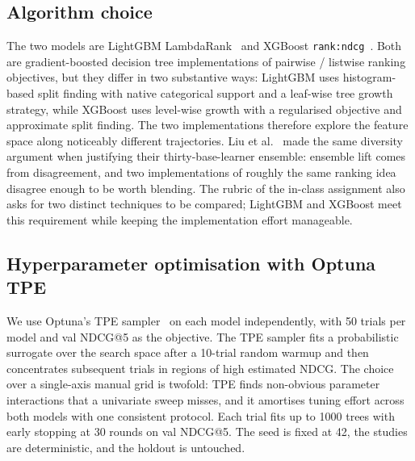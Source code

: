 
\subsection{Algorithm choice}

The two models are LightGBM LambdaRank~\cite{ke2017lightgbm} and XGBoost \texttt{rank:ndcg}~\cite{chen2016xgboost}. Both are gradient-boosted decision tree implementations of pairwise / listwise ranking objectives, but they differ in two substantive ways: LightGBM uses histogram-based split finding with native categorical support and a leaf-wise tree growth strategy, while XGBoost uses level-wise growth with a regularised objective and approximate split finding. The two implementations therefore explore the feature space along noticeably different trajectories. Liu et al.~\cite{liu2013expedia} made the same diversity argument when justifying their thirty-base-learner ensemble: ensemble lift comes from disagreement, and two implementations of roughly the same ranking idea disagree enough to be worth blending. The rubric of the in-class assignment also asks for two distinct techniques to be compared; LightGBM and XGBoost meet this requirement while keeping the implementation effort manageable.

\subsection{Hyperparameter optimisation with Optuna TPE}

We use Optuna's TPE sampler~\cite{bergstra2011tpe,akiba2019optuna} on each model independently, with 50 trials per model and val NDCG@5 as the objective. The TPE sampler fits a probabilistic surrogate over the search space after a 10-trial random warmup and then concentrates subsequent trials in regions of high estimated NDCG. The choice over a single-axis manual grid is twofold: TPE finds non-obvious parameter interactions that a univariate sweep misses, and it amortises tuning effort across both models with one consistent protocol. Each trial fits up to 1000 trees with early stopping at 30 rounds on val NDCG@5. The seed is fixed at 42, the studies are deterministic, and the holdout is untouched.

